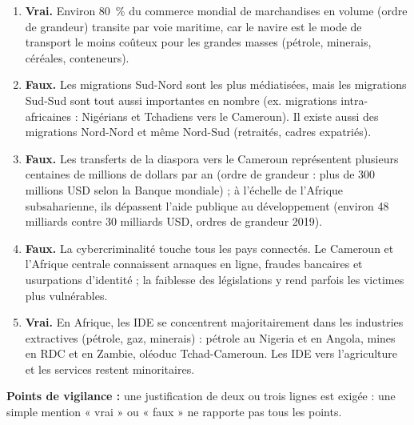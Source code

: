 \documentclass[11pt]{article}
\begin{document}
\begin{corrige}
\begin{enumerate}
\item \textbf{Vrai.} Environ 80~\% du commerce mondial de marchandises en volume (ordre de grandeur) transite par voie maritime, car le navire est le mode de transport le moins coûteux pour les grandes masses (pétrole, minerais, céréales, conteneurs).
\item \textbf{Faux.} Les migrations Sud-Nord sont les plus médiatisées, mais les migrations Sud-Sud sont tout aussi importantes en nombre (ex. migrations intra-africaines : Nigérians et Tchadiens vers le Cameroun). Il existe aussi des migrations Nord-Nord et même Nord-Sud (retraités, cadres expatriés).
\item \textbf{Faux.} Les transferts de la diaspora vers le Cameroun représentent plusieurs centaines de millions de dollars par an (ordre de grandeur : plus de 300 millions USD selon la Banque mondiale) ; à l'échelle de l'Afrique subsaharienne, ils dépassent l'aide publique au développement (environ 48 milliards contre 30 milliards USD, ordres de grandeur 2019).
\item \textbf{Faux.} La cybercriminalité touche tous les pays connectés. Le Cameroun et l'Afrique centrale connaissent arnaques en ligne, fraudes bancaires et usurpations d'identité ; la faiblesse des législations y rend parfois les victimes plus vulnérables.
\item \textbf{Vrai.} En Afrique, les IDE se concentrent majoritairement dans les industries extractives (pétrole, gaz, minerais) : pétrole au Nigeria et en Angola, mines en RDC et en Zambie, oléoduc Tchad-Cameroun. Les IDE vers l'agriculture et les services restent minoritaires.
\end{enumerate}
\textbf{Points de vigilance :} une justification de deux ou trois lignes est exigée : une simple mention « vrai » ou « faux » ne rapporte pas tous les points.
\end{corrige}
\end{document}
